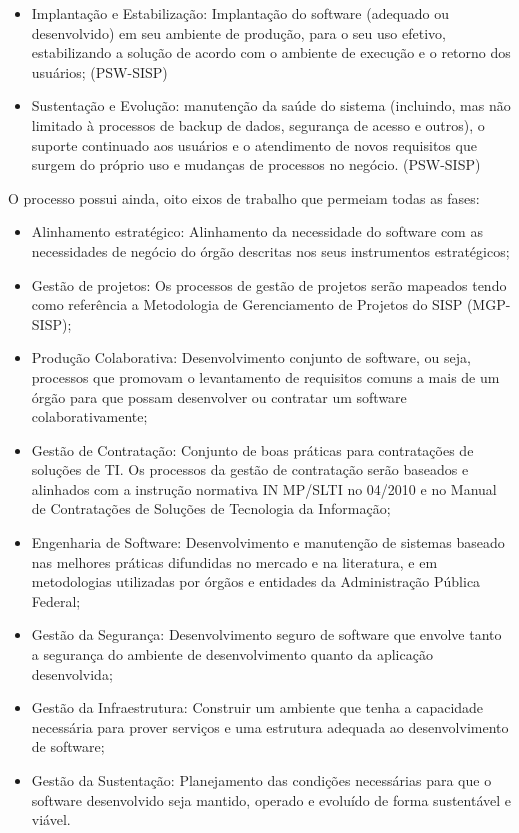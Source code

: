 \begin{itemize}
\item Implantação e Estabilização: Implantação do software (adequado ou desenvolvido) 
em seu ambiente de produção, para o seu uso efetivo, estabilizando a solução de 
acordo com o ambiente de execução e o retorno dos usuários; (PSW-SISP)

\item Sustentação e Evolução: manutenção da saúde do sistema (incluindo, mas não 
limitado à processos de backup de dados, segurança de acesso e outros), o suporte 
continuado aos usuários e o atendimento de novos requisitos que surgem do próprio 
uso e mudanças de processos no negócio. (PSW-SISP)

\end{itemize}

O processo possui ainda, oito eixos de trabalho que permeiam todas as fases:

\begin{itemize}

\item Alinhamento estratégico: Alinhamento da necessidade do software com as
necessidades de negócio do órgão descritas nos seus instrumentos estratégicos;

\item Gestão de projetos: Os processos de gestão de projetos serão mapeados 
tendo como referência a Metodologia de Gerenciamento de Projetos do SISP (MGP-SISP);

\item Produção Colaborativa: Desenvolvimento conjunto de software, ou seja, processos
que promovam o levantamento de requisitos comuns a mais de um órgão para que 
possam desenvolver ou contratar um software colaborativamente;

\item Gestão de Contratação: Conjunto de boas práticas para contratações de
soluções de TI. Os processos da gestão de contratação serão baseados e alinhados 
com a instrução normativa IN MP/SLTI no 04/2010 e no Manual de Contratações de 
Soluções de Tecnologia da Informação;

\item Engenharia de Software: Desenvolvimento e manutenção de sistemas baseado nas
melhores práticas difundidas no mercado e na literatura, e em metodologias 
utilizadas por órgãos e entidades da Administração Pública Federal;

\item Gestão da Segurança: Desenvolvimento seguro de software que envolve tanto a
segurança do ambiente de desenvolvimento quanto da aplicação desenvolvida;

\item Gestão da Infraestrutura: Construir um ambiente que tenha a capacidade 
necessária para prover serviços e uma estrutura adequada ao desenvolvimento de
software;

\item Gestão da Sustentação: Planejamento das condições necessárias para que o 
software desenvolvido seja mantido, operado e evoluído de forma sustentável e 
viável.
  	
\end{itemize}

